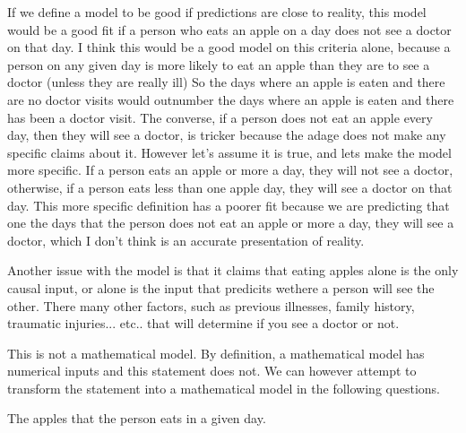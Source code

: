 \documentclass[12pt]{article}
\begin{document}

\begin{enumerate}



If we define a model to be good if predictions are close to reality, this model would be a good fit if a person who eats an apple on a day does not see a doctor on that day. I think this would be a good model on this criteria alone, because a person on any given day is more likely to eat an apple than they are to see a doctor (unless they are really ill) So the days where an apple is eaten and there are no doctor visits would outnumber the days where an apple is eaten and there has been a doctor visit. The converse, if a person does not eat an apple every day, then they will see a doctor, is tricker because the adage does not make any specific claims about it. However let's assume it is true, and lets make the model more specific. If a person eats an apple or more a day, they will not see a doctor, otherwise, if a person eats less than one apple day, they will see a doctor on that day. This more specific definition has a poorer fit because we are predicting that one the days that the person does not eat an apple or more a day, they will see a doctor, which I don't think is an accurate presentation of reality.

Another issue with the model is that it claims that eating apples alone is the only causal input, or alone is the input that predicits wethere a person will see the other. There many other factors, such as previous illnesses, family history, traumatic injuries... etc.. that will determine if you see a doctor or not.


This is not a mathematical model. By definition, a mathematical model has numerical inputs and this statement does not. We can however attempt to transform the statement into a mathematical model in the following questions.


The apples that the person eats in a given day.



\end{enumerate}
\end{document}
